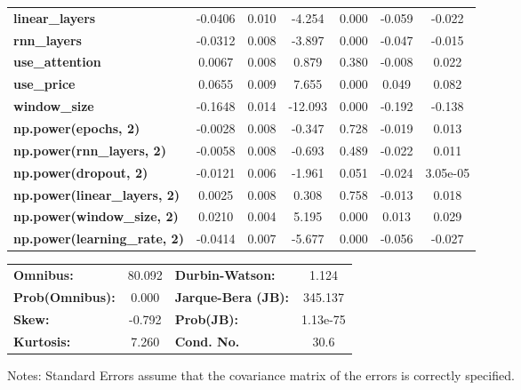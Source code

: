 \begin{center}
\begin{tabular}{lcccccc}
\textbf{linear\_layers}              &      -0.0406  &        0.010     &    -4.254  &         0.000        &       -0.059    &       -0.022     \\
\textbf{rnn\_layers}                 &      -0.0312  &        0.008     &    -3.897  &         0.000        &       -0.047    &       -0.015     \\
\textbf{use\_attention}              &       0.0067  &        0.008     &     0.879  &         0.380        &       -0.008    &        0.022     \\
\textbf{use\_price}                  &       0.0655  &        0.009     &     7.655  &         0.000        &        0.049    &        0.082     \\
\textbf{window\_size}                &      -0.1648  &        0.014     &   -12.093  &         0.000        &       -0.192    &       -0.138     \\
\textbf{np.power(epochs, 2)}         &      -0.0028  &        0.008     &    -0.347  &         0.728        &       -0.019    &        0.013     \\
\textbf{np.power(rnn\_layers, 2)}    &      -0.0058  &        0.008     &    -0.693  &         0.489        &       -0.022    &        0.011     \\
\textbf{np.power(dropout, 2)}        &      -0.0121  &        0.006     &    -1.961  &         0.051        &       -0.024    &     3.05e-05     \\
\textbf{np.power(linear\_layers, 2)} &       0.0025  &        0.008     &     0.308  &         0.758        &       -0.013    &        0.018     \\
\textbf{np.power(window\_size, 2)}   &       0.0210  &        0.004     &     5.195  &         0.000        &        0.013    &        0.029     \\
\textbf{np.power(learning\_rate, 2)} &      -0.0414  &        0.007     &    -5.677  &         0.000        &       -0.056    &       -0.027     \\
\bottomrule
\end{tabular}
\begin{tabular}{lclc}
\textbf{Omnibus:}       & 80.092 & \textbf{  Durbin-Watson:     } &    1.124  \\
\textbf{Prob(Omnibus):} &  0.000 & \textbf{  Jarque-Bera (JB):  } &  345.137  \\
\textbf{Skew:}          & -0.792 & \textbf{  Prob(JB):          } & 1.13e-75  \\
\textbf{Kurtosis:}      &  7.260 & \textbf{  Cond. No.          } &     30.6  \\
\bottomrule
\end{tabular}
\end{center}

Notes: \newline
 [1] Standard Errors assume that the covariance matrix of the errors is correctly specified.